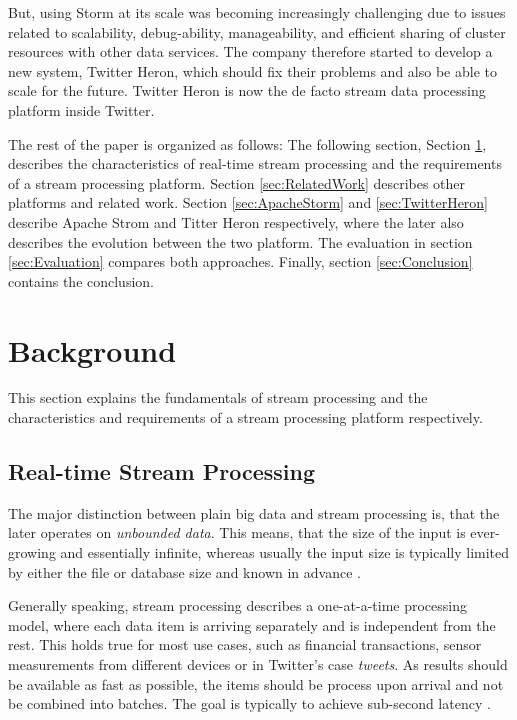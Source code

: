 \documentclass[conference]{IEEEtran}
\begin{document}
But, using Storm at its scale was becoming increasingly challenging due to issues related to scalability, debug-ability, manageability, and efficient sharing of cluster resources with other data services.
The company therefore started to develop a new system, Twitter Heron, which should fix their problems and also be able to scale for the future.
Twitter Heron is now the de facto stream data processing platform inside Twitter.

The rest of the paper is organized as follows: The following section, Section \ref{sec:Background}, describes the characteristics of real-time stream processing and the requirements of a stream processing platform.
Section \ref{sec:RelatedWork} describes other platforms and related work.
Section \ref{sec:ApacheStorm} and \ref{sec:TwitterHeron} describe Apache Strom and Titter Heron respectively, where the later also describes the evolution between the two platform.
The evaluation in section \ref{sec:Evaluation} compares both approaches.
Finally, section \ref{sec:Conclusion} contains the conclusion.

\section{Background}
\label{sec:Background}

This section explains the fundamentals of stream processing and the characteristics and requirements of a stream processing platform respectively.

\subsection{Real-time Stream Processing}
\label{sec:RealTimeStreamProcessing}

The major distinction between plain big data and stream processing is, that the later operates on \emph{unbounded data}.
This means, that the size of the input is ever-growing and essentially infinite, whereas usually the input size is typically limited by either the file or database size and known in advance \cite{WorldBeyondBatch}.

Generally speaking, stream processing describes a one-at-a-time processing model, where each data item is arriving separately and is independent from the rest.
This holds true for most use cases, such as financial transactions, sensor measurements from different devices or in Twitter's case \emph{tweets}.
As results should be available as fast as possible, the items should be process upon arrival and not be combined into batches.
The goal is typically to achieve sub-second latency \cite{BeyondBatchProcessing}.
\end{document}
